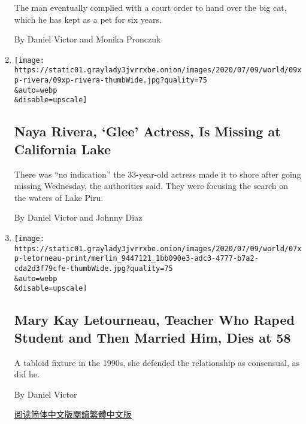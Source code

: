 \begin{enumerate}
  The man eventually complied with a court order to hand over the big
  cat, which he has kept as a pet for six years.

  By Daniel Victor and Monika Pronczuk
\item
  \href{/2020/07/09/arts/television/naya-rivera-glee-missing.html}{}

  \texttt{[image: https://static01.graylady3jvrrxbe.onion/images/2020/07/09/world/09xp-rivera/09xp-rivera-thumbWide.jpg?quality=75\\\&auto=webp\\\&disable=upscale]}

  \hypertarget{naya-rivera-glee-actress-is-missing-at-california-lake}{%
  \subsection{Naya Rivera, `Glee' Actress, Is Missing at California
  Lake}\label{naya-rivera-glee-actress-is-missing-at-california-lake}}

  There was ``no indication'' the 33-year-old actress made it to shore
  after going missing Wednesday, the authorities said. They were
  focusing the search on the waters of Lake Piru.

  By Daniel Victor and Johnny Diaz
\item
  \href{/2020/07/07/obituaries/mary-kay-letourneau-dead.html}{}

  \texttt{[image: https://static01.graylady3jvrrxbe.onion/images/2020/07/09/world/07xp-letorneau-print/merlin\_9447121\_1bb090e3-adc3-4777-b7a2-cda2d3f79cfe-thumbWide.jpg?quality=75\\\&auto=webp\\\&disable=upscale]}

  \hypertarget{mary-kay-letourneau-teacher-who-raped-student-and-then-married-him-dies-at-58}{%
  \subsection{Mary Kay Letourneau, Teacher Who Raped Student and Then
  Married Him, Dies at
  58}\label{mary-kay-letourneau-teacher-who-raped-student-and-then-married-him-dies-at-58}}

  A tabloid fixture in the 1990s, she defended the relationship as
  consensual, as did he.

  By Daniel Victor

  \href{https://cn.nytimes3xbfgragh.onion/obits/20200709/mary-kay-letourneau-dead/}{阅读简体中文版}\href{https://cn.nytimes3xbfgragh.onion/obits/20200709/mary-kay-letourneau-dead/zh-hant/}{閱讀繁體中文版}
\end{enumerate}

